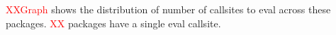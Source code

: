 \documentclass[conference]{IEEEtran}
\newcommand{\missingNumber}{\textcolor{red}{XX}\xspace}
\newcommand{\missingGraph}{\textcolor{red}{XXGraph}\xspace}
\begin{document}
\begin{table}[ht]
  \label{table:top-ten-package-summary}
  \caption{Distribution of eval calls and callsites in the top ten packages}
\end{table}


\missingGraph shows the distribution of number of callsites to eval across these
packages. \missingNumber packages have a single eval callsite.
\end{document}
